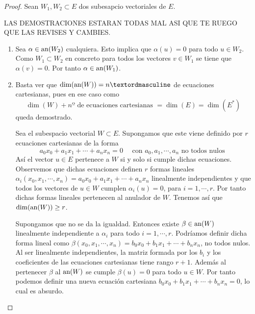 \begin{proof}
	Sean $W_1,W_2\subset E$ dos subesapcio vectoriales de $E$.
	
	LAS DEMOSTRACIONES ESTARAN TODAS MAL ASI QUE TE RUEGO QUE LAS REVISES Y CAMBIES.
	\begin{enumerate}
		\item Sea $\alpha\in \text{an}(W_2)$ cualquiera. Esto implica que $\alpha(u)=0$ para todo $u\in W_2$. Como $W_1\subset W_2$ en concreto para todos los vectores $v\in W_1$ se tiene que $\alpha(v)=0$. Por tanto $\alpha\in \text{an}(W_1)$.
		
		\item Basta ver que $\dim(\an{W})= nº$ de ecuaciones cartesianas, pues en ese caso como 
		\begin{equation*}
			\dim(W)+ nº\text{ de ecuaciones cartesianas }=\dim( E)=\dim(E^*)
		\end{equation*}
		queda demostrado.
		
		Sea el subespacio vectorial $W\subset E$. Supongamos que este viene definido por $r$ ecuaciones cartesianas de la forma
		\begin{equation*}
			a_0x_0+a_1x_1+\cdots +a_nx_n=0 \quad \text{ con } a_0,a_1,\cdots, a_n \text{ no todos nulos }
		\end{equation*}
		Así  el vector $u\in E$ pertenece a $W$ si y solo si cumple dichas ecuaciones. Observemos que dichas ecuaciones definen $r$ formas lineales $\alpha_i(x_0,x_1,\cdots, x_n)=a_0x_0+a_1x_1+\cdots +a_nx_n$ linealmente independientes y que todos los vectores de $u\in W$ cumplen $\alpha_i(u)=0$, para $i=1,\cdots, r$. Por tanto dichas formas lineales pertenecen al anulador de $W$. Tenemos así que $\dim(\text{an}(W))\ge r$.
		
		Supongamos que no se da la igualdad. Entonces existe $\beta\in \text{an}(W)$ linealmente independiente a $\alpha_i$ para todo $i=1,\cdots, r$. Podríamos definir dicha forma lineal como $\beta(x_0,x_1,\cdots, x_n)=b_0x_0+b_1x_1+\cdots +b_nx_n$, no todos nulos. Al ser linealmente independientes, la matriz formada por los $b_i$ y los coeficientes de las ecuaciones cartesianas tiene rango $r+1$. Además al pertenecer $\beta$ al $\text{an}(W)$ se cumple $\beta(u)=0$ para todo $u\in W$. Por tanto podemos definir una nueva ecuación cartesiana $b_0x_0+b_1x_1+\cdots +b_nx_n=0$, lo cual es absurdo.
		

\end{enumerate}
\end{proof}

